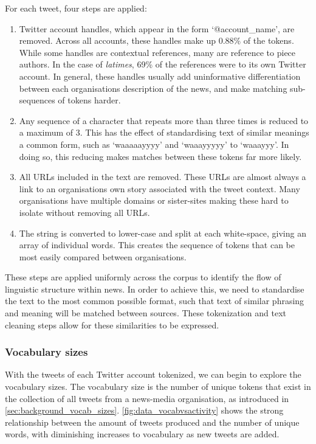 For each tweet, four steps are applied:
\begin{enumerate}
	\item Twitter account handles, which appear in the form `@account\_name', are removed. Across all accounts, these handles make up 0.88\% of the tokens. While some handles are contextual references, many are reference to piece authors. In the case of \emph{latimes}, 69\% of the references were to its own Twitter account. In general, these handles usually add uninformative differentiation between each organisations description of the news, and make matching sub-sequences of tokens harder.
	\item Any sequence of a character that repeats more than three times is reduced to a maximum of 3. This has the effect of standardising text of similar meanings a common form, such as `waaaaayyyy' and `waaayyyyy' to `waaayyy'. In doing so, this reducing makes matches between these tokens far more likely.
	\item All URLs included in the text are removed. These URLs are almost always a link to an organisations own story associated with the tweet context. Many organisations have multiple domains or sister-sites making these hard to isolate without removing all URLs.  
	\item The string is converted to lower-case and split at each white-space, giving an array of individual words. This creates the sequence of tokens that can be most easily compared between organisations.
\end{enumerate}

These steps are applied uniformly across the corpus to identify the flow of linguistic structure within news. In order to achieve this, we need to standardise the text to the most common possible format, such that text of similar phrasing and meaning will be matched between sources. These tokenization and text cleaning steps allow for these similarities to be expressed.


\subsubsection{Vocabulary sizes}\label{sec:vocabsizes}

With the tweets of each Twitter account tokenized, we can begin to explore the vocabulary sizes. The vocabulary size is the number of unique tokens that exist in the collection of all tweets from a news-media organisation, as introduced in \autoref{sec:background_vocab_sizes}. \autoref{fig:data_vocabvsactivity} shows the strong relationship between the amount of tweets produced and the number of unique words, with diminishing increases to vocabulary as new tweets are added.

